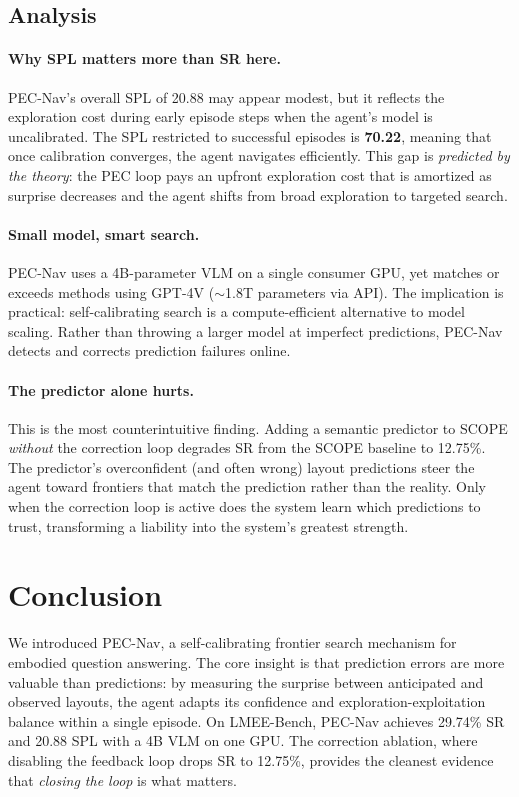 \documentclass[10pt,twocolumn,letterpaper]{article}
\begin{document}
\subsection{Analysis}

\paragraph{Why SPL matters more than SR here.} PEC-Nav's overall SPL of 20.88 may appear modest, but it reflects the exploration cost during early episode steps when the agent's model is uncalibrated. The SPL restricted to successful episodes is \textbf{70.22}, meaning that once calibration converges, the agent navigates efficiently. This gap is \emph{predicted by the theory}: the PEC loop pays an upfront exploration cost that is amortized as surprise decreases and the agent shifts from broad exploration to targeted search.

\paragraph{Small model, smart search.} PEC-Nav uses a 4B-parameter VLM on a single consumer GPU, yet matches or exceeds methods using GPT-4V ($\sim$1.8T parameters via API). The implication is practical: self-calibrating search is a compute-efficient alternative to model scaling. Rather than throwing a larger model at imperfect predictions, PEC-Nav detects and corrects prediction failures online.

\paragraph{The predictor alone hurts.} This is the most counterintuitive finding. Adding a semantic predictor to SCOPE \emph{without} the correction loop degrades SR from the SCOPE baseline to 12.75\%. The predictor's overconfident (and often wrong) layout predictions steer the agent toward frontiers that match the prediction rather than the reality. Only when the correction loop is active does the system learn which predictions to trust, transforming a liability into the system's greatest strength.

\section{Conclusion}

We introduced PEC-Nav, a self-calibrating frontier search mechanism for embodied question answering. The core insight is that prediction errors are more valuable than predictions: by measuring the surprise between anticipated and observed layouts, the agent adapts its confidence and exploration-exploitation balance within a single episode. On LMEE-Bench, PEC-Nav achieves 29.74\% SR and 20.88 SPL with a 4B VLM on one GPU. The correction ablation, where disabling the feedback loop drops SR to 12.75\%, provides the cleanest evidence that \emph{closing the loop} is what matters.
\end{document}
